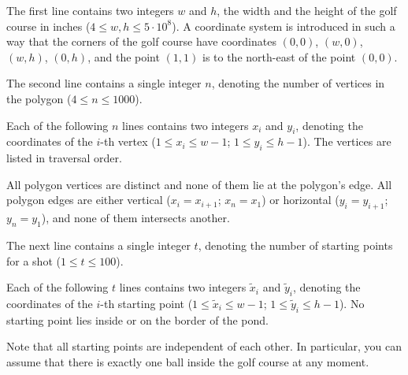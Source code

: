 The first line contains two integers $w$ and $h$, the width and the height of the golf course in inches ($4 \le w, h \le 5 \cdot 10^8$). A coordinate system is introduced in such a way that the corners of the golf course have coordinates $(0, 0)$, $(w, 0)$, $(w, h)$, $(0, h)$, and the point $(1, 1)$ is to the north-east of the point $(0, 0)$.

The second line contains a single integer $n$, denoting the number of vertices in the polygon ($4 \le n \le 1000$).

Each of the following $n$ lines contains two integers $x_i$ and $y_i$, denoting the coordinates of the $i$-th vertex ($1 \le x_i \le w - 1$; $1 \le y_i \le h - 1$). The vertices are listed in traversal order.

All polygon vertices are distinct and none of them lie at the polygon's edge.
All polygon edges are either vertical ($x_i = x_{i+1}$; $x_n=x_1$) or horizontal ($y_i = y_{i+1}$; $y_n=y_1$), and none of them intersects another.

The next line contains a single integer $t$, denoting the number of starting points for a shot ($1 \le t \le 100$).

Each of the following $t$ lines contains two integers $\tilde{x}_i$ and $\tilde{y}_i$, denoting the coordinates of the $i$-th starting point ($1 \le \tilde{x}_i \le w - 1$; $1 \le \tilde{y}_i \le h - 1$). No starting point lies inside or on the border of the pond.

Note that all starting points are independent of each other. In particular, you can assume that there is exactly one ball inside the golf course at any moment.
